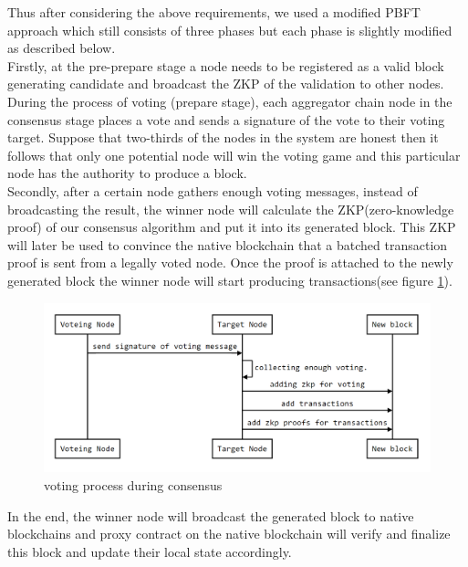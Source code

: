 \documentclass[pageno]{jpaper}
\begin{document}
Thus after considering the above requirements, we used a modified PBFT approach which still consists of three phases but each phase is slightly modified as described below.\\
\newline
Firstly, at the pre-prepare stage a node needs to be registered as a valid block generating candidate and broadcast the ZKP of the validation to other nodes. During the process of voting (prepare stage), each aggregator chain node in the consensus stage places a vote and sends a signature of the vote to their voting target. Suppose that two-thirds of the nodes in the system are honest then it follows that only one potential node will win the voting game and this particular node has the authority to produce a block.\\
\newline
Secondly, after a certain node gathers enough voting messages, instead of broadcasting the result, the winner node will calculate the ZKP(zero-knowledge proof) of our consensus algorithm and put it into its generated block. This ZKP will later be used to convince the native blockchain that a batched transaction proof is sent from a legally voted node. Once the proof is attached to the newly generated block the winner node will start producing transactions(see figure \ref{vote-sequence}).

\begin{figure}[!ht]
\includegraphics[scale=0.4]{vote-sequence.png}
\caption{voting process during consensus}
\label{vote-sequence}
\end{figure}

In the end, the winner node will broadcast the generated block to native blockchains and \dprotocol proxy contract on the native blockchain will verify and finalize this block and update their local state accordingly.
\end{document}
